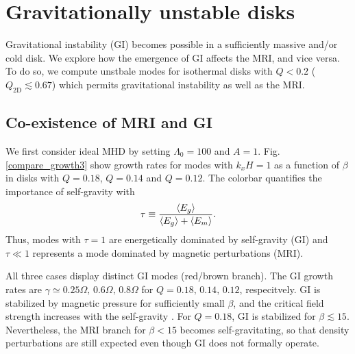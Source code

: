 \section{Gravitationally unstable disks} \label{result2}
Gravitational instability (GI) becomes possible in a sufficiently
massive and/or cold disk. We explore how the emergence of GI affects
the MRI, and vice versa. To do so, we compute unstbale modes for  
isothermal disks with $Q < 0.2 $ ($Q_\mathrm{2D}\lesssim 0.67$) which
permits gravitational instability as well as the MRI.  

\subsection{Co-existence of MRI and GI}
We first consider ideal MHD by setting $\Lambda_0=100$ and $A=1$. 
Fig. \ref{compare_growth3} show growth rates for 
modes with $k_xH=1$ as a function of $\beta$ in disks with $Q=0.18$,
$Q=0.14$ and $Q=0.12$. The colorbar quantifies the importance of
self-gravity with 
\begin{align}
 \tau \equiv \frac{\langle{E_g}\rangle}{\langle{E_g}\rangle + \langle{E_m}\rangle}. 
\end{align} 
Thus, modes with $\tau  = 1$ are
energetically dominated by self-gravity (GI) and $\tau\ll1$ represents a mode
dominated by magnetic perturbations (MRI).  

All three cases display distinct GI modes (red/brown branch). The GI
growth rates are $\gamma\simeq 0.25\Omega,\,0.6\Omega,\,0.8\Omega$ for
$Q=0.18,\,0.14,\,0.12$, respecitvely. GI is stabilized by magnetic
pressure for sufficiently small $\beta$, and the critical field
strength increases with the self-gravity \citep{nakamura83}. For
$Q=0.18$, GI is stabilized for $\beta \lesssim 15$. Nevertheless, 
the MRI branch for $\beta < 15$ becomes self-gravitating, so that
density perturbations are still expected even though  GI does not
formally operate.  


